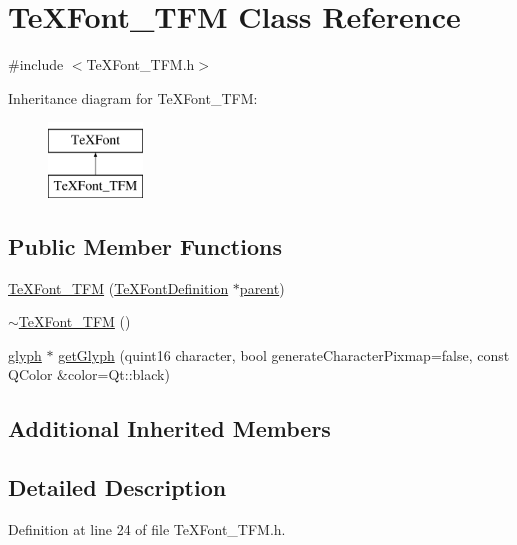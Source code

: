 \hypertarget{classTeXFont__TFM}{\section{Te\+X\+Font\+\_\+\+T\+F\+M Class Reference}
\label{classTeXFont__TFM}
}


{\ttfamily \#include $<$Te\+X\+Font\+\_\+\+T\+F\+M.\+h$>$}

Inheritance diagram for Te\+X\+Font\+\_\+\+T\+F\+M\+:\begin{figure}[H]
\begin{center}
\leavevmode
\includegraphics[height=2.000000cm]{classTeXFont__TFM}
\end{center}
\end{figure}
\subsection*{Public Member Functions}
\begin{DoxyCompactItemize}
\item 
\hyperlink{classTeXFont__TFM_ae01e0edc918eaa9acd8d29938dc318f3}{Te\+X\+Font\+\_\+\+T\+F\+M} (\hyperlink{classTeXFontDefinition}{Te\+X\+Font\+Definition} $\ast$\hyperlink{classTeXFont_a72d8eb1f0377749cf4a45dfabf1c3dd5}{parent})
\item 
\hyperlink{classTeXFont__TFM_a1ff12e0d5a2a6d2eb4e200755891716f}{$\sim$\+Te\+X\+Font\+\_\+\+T\+F\+M} ()
\item 
\hyperlink{classglyph}{glyph} $\ast$ \hyperlink{classTeXFont__TFM_a4e42a94f04f889575227dd994645979e}{get\+Glyph} (quint16 character, bool generate\+Character\+Pixmap=false, const Q\+Color \&color=Qt\+::black)
\end{DoxyCompactItemize}
\subsection*{Additional Inherited Members}


\subsection{Detailed Description}


Definition at line 24 of file Te\+X\+Font\+\_\+\+T\+F\+M.\+h.



